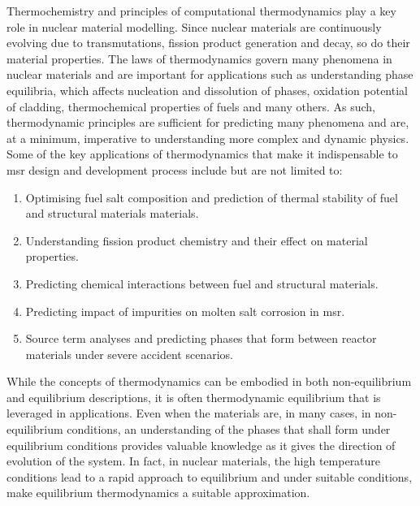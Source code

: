     Thermochemistry and principles of computational thermodynamics play a key role in nuclear material modelling. Since nuclear materials are continuously evolving due to transmutations, fission product generation and decay, so do their material properties. The laws of thermodynamics govern many phenomena in nuclear materials and are important for applications such as understanding phase equilibria, which affects nucleation and dissolution of phases, oxidation potential of cladding, thermochemical properties of fuels and many others. As such, thermodynamic principles are sufficient for predicting many phenomena and are, at a minimum, imperative to understanding more complex and dynamic physics. Some of the key applications of thermodynamics that make it indispensable to \gls{msr} design and development process include but are not limited to:
    \begin{enumerate} \compresslist
        \item Optimising fuel salt composition and prediction of thermal stability of fuel and structural materials materials.
	\item Understanding fission product chemistry and their effect on material properties.
	\item Predicting chemical interactions between fuel and structural materials.
	\item Predicting impact of impurities on molten salt corrosion in \gls{msr}.
        \item Source term analyses and predicting phases that form between reactor materials under severe accident scenarios.
    \end{enumerate}
	
	While the concepts of thermodynamics can be embodied in both non-equilibrium and equilibrium descriptions, it is often thermodynamic equilibrium that is leveraged in applications. Even when the materials are, in many cases, in non-equilibrium conditions, an understanding of the phases that shall form under equilibrium conditions provides valuable knowledge as it gives the direction of evolution of the system.  In fact, in nuclear materials, the high temperature conditions lead to a rapid approach to equilibrium and under suitable conditions, make equilibrium thermodynamics a suitable approximation.
	
